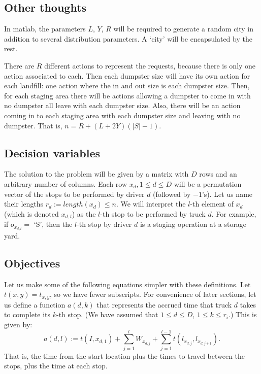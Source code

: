 \documentclass{article}
\begin{document}
\subsection{Other thoughts}

In matlab, the parameters 
  $L$,
  $Y$,
  $R$
will be required to generate a random city in addition to several distribution parameters.
A `city' will be encapsulated by the rest.

There are $R$ different actions to represent the requests, because there is only one action associated to each.
Then each dumpster size will have its own action for each landfill: one action where the in and out size is each dumpster size.
Then, for each staging area there will be actions allowing a dumpster to come in with no dumpster all leave with each dumpster size.
Also, there will be an action coming in to each staging area with each dumpster size and leaving with no dumpster.
That is, $n = R + (L + 2 Y) (|S| - 1)$.

\subsection{Decision variables}

The solution to the problem will be given by a matrix with $D$ rows and an arbitrary number of columns.
Each row $x_d, 1 \le d \le D$ will be a permutation vector of the stops to be performed by driver $d$ (followed by $-1$'s).
Let us name their lengths $r_d := length(x_d) \le n$.
We will interpret the $l$-th element of $x_{d}$ (which is denoted $x_{d,l}$) as the $l$-th stop to be performed by truck $d$.
For example, if $o_{x_{d,l}} =$ `S', then the $l$-th stop by driver $d$ is a staging operation at a storage yard.

\subsection{Objectives}

Let us make some of the following equations simpler with these definitions.
Let $t(x,y) = t_{x,y}$, so we have fewer subscripts.
For convenience of later sections, let us define a function $a(d, k)$ that represents the accrued time that truck $d$ takes to complete its $k$-th stop.
(We have assumed that $1 \le d \le D$, $1 \le k \le r_i$.)
This is given by:
$$a(d,l) := t(I, x_{d, 1}) + \sum_{j=1}^{l} W_{x_{d,j}} + \sum_{j=1}^{l-1} t(l_{x_{d,j}},l_{x_{d,j+1}} ).$$
That is, the time from the start location plus the times to travel between the stops, plus the time at each stop.
\end{document}
